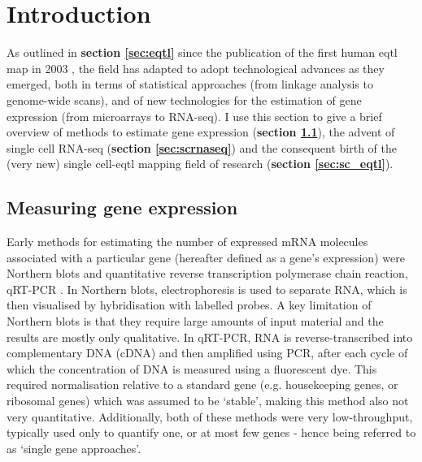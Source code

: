 \newpage

\section{Introduction}

As outlined in \textbf{section 
\ref{sec:eqtl}} 
since the publication of the first human \gls{eqtl} map in 2003 \cite{schadt2003genetics}, the field has adapted to adopt technological advances as they emerged, both in terms of statistical approaches (from linkage analysis to genome-wide scans), and of new technologies for the estimation of gene expression (from microarrays to RNA-seq).
I use this section to give a brief overview of methods to estimate gene expression (\textbf{section \ref{sec:gene_expression}}), the advent of single cell RNA-seq (\textbf{section \ref{sec:scrnaseq}}) and the consequent birth of the (very new) single cell-\gls{eqtl} mapping field of research (\textbf{section \ref{sec:sc_eqtl}}). 

\subsection{Measuring gene expression}
\label{sec:gene_expression}

Early methods for estimating the number of expressed mRNA molecules associated with a particular gene (hereafter defined as a gene's expression)
were Northern blots \cite{alwine1977method} and quantitative reverse transcription polymerase chain reaction, qRT-PCR \cite{gibson1996novel}. 
In Northern blots, electrophoresis is used to separate RNA, which is then visualised by hybridisation with labelled probes. 
A key limitation of Northern blots is that they require large amounts of input material and the results are mostly only qualitative.
In qRT-PCR, RNA is reverse-transcribed into complementary DNA (cDNA) and then amplified using PCR, after each cycle of which the concentration of DNA is measured using a fluorescent dye. 
This required normalisation relative to a standard gene (e.g. 
housekeeping genes, or 
ribosomal genes) which was assumed to be `stable', making this method also not very quantitative.
Additionally, both of these methods were very low-throughput, typically used only to quantify one, or at most few genes - hence being referred to as `single gene approaches'.
\\

